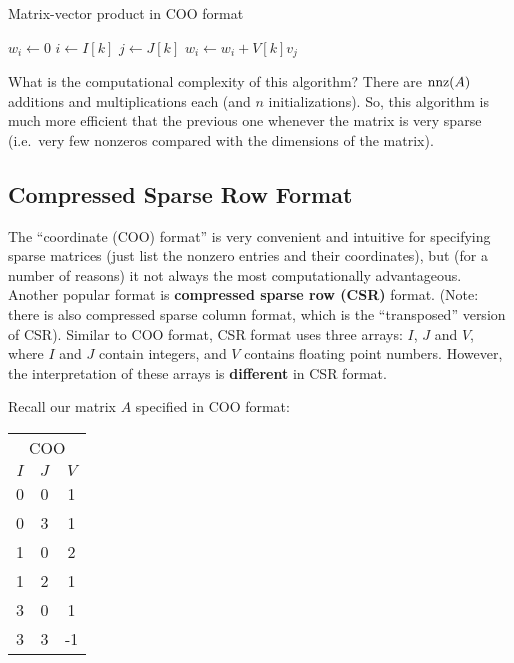 \documentclass{lecture}
\begin{document}
\begin{algorithm}[H]
   \caption{Matrix-vector product in COO format}
   \begin{algorithmic}[1]
         \State $w_i \gets 0$
      \EndFor
         \State $i \gets I[k]$
         \State $j \gets J[k]$
         \State $w_i \gets w_i + V[k] v_j$
      \EndFor
   \end{algorithmic}
\end{algorithm}

What is the computational complexity of this algorithm?
There are $\operatorname{nnz}(A)$ additions and multiplications each (and $n$ initializations).
So, this algorithm is much more efficient that the previous one whenever the matrix is very sparse (i.e.\ very few nonzeros compared with the dimensions of the matrix).

\subsection*{Compressed Sparse Row Format}

The ``coordinate (COO) format'' is very convenient and intuitive for specifying sparse matrices (just list the nonzero entries and their coordinates), but (for a number of reasons) it not always the most computationally advantageous.
Another popular format is \textbf{compressed sparse row (CSR)} format.
(Note: there is also compressed sparse column format, which is the ``transposed'' version of CSR).
Similar to COO format, CSR format uses three arrays: $I$, $J$ and $V$, where $I$ and $J$ contain integers, and $V$ contains floating point numbers.
However, the interpretation of these arrays is \textbf{different} in CSR format.

Recall our matrix $A$ specified in COO format:

\begin{center}
   \begin{tabular}{ccc}
      \multicolumn{3}{c}{COO}\\
      $I$ & $J$ & $V$\\
      \hline
      0&0&1\\
      0&3&1\\
      1&0&2\\
      1&2&1\\
      3&0&1\\
      3&3&-1
   \end{tabular}
\end{center}
\end{document}
